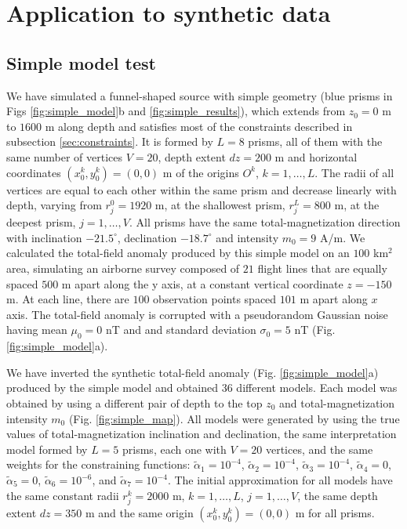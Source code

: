 \section{Application to synthetic data}\label{sec:synthetic}

\subsection{Simple model test}

We have simulated a funnel-shaped source with simple geometry (blue prisms in Figs \ref{fig:simple_model}b and \ref{fig:simple_results}), which extends from $z_0=0$ m to $1600$ m along depth and satisfies most of the constraints described in subsection \ref{sec:constraints}. It is formed by $L=8$ prisms, all of them with the same number of vertices $ V = 20 $, depth extent $ dz = 200 $ m and horizontal coordinates $ (x_0^k, y_0^k) = (0, 0) $ m of the origins $O^k$, $k=1,\dots,L$. The radii of all vertices are equal to each other within the same prism and decrease linearly with depth, varying from $r_j^0=1920$ m, at the shallowest prism, $r_j^L=800$ m, at the deepest prism, $j=1,\dots, V$. All prisms have the same total-magnetization direction with inclination $ -21.5^\circ $, declination $ -18.7^\circ $ and intensity $ m_0 = 9 $ A/m. We calculated the total-field anomaly produced by this simple model on an $ 100 $ km$^2$ area, simulating an airborne survey composed of $ 21 $ flight lines that are equally spaced $ 500 $ m apart along the y axis, at a constant vertical coordinate $ z = -150 $ m. At each line, there are $ 100 $ observation points spaced $101$ m apart along $ x $ axis. The total-field anomaly is corrupted with a pseudorandom Gaussian noise having mean $ \mu_0=0 $ nT and and standard deviation $ \sigma_0=5 $ nT (Fig. \ref{fig:simple_model}a).

We have inverted the synthetic total-field anomaly (Fig. \ref{fig:simple_model}a) produced by the simple model and obtained 36 different models. Each model was obtained by using a different pair of depth to the top $ z_0 $ and total-magnetization intensity $ m_0 $ (Fig. \ref{fig:simple_map}). All models were generated by using the true values of total-magnetization inclination and declination, the same interpretation model formed by $ L = 5 $ prisms, each one with $ V = 20 $ vertices, and the same weights for the constraining functions: $\tilde{\alpha}_1 = 10^{-4}$, $\tilde{\alpha}_2 = 10^{-4}$, $\tilde{\alpha}_3 = 10^{-4}$, $\tilde{\alpha}_4 = 0$, $\tilde{\alpha}_5 = 0$, $\tilde{\alpha}_6 = 10^{-6}$, and $\tilde{\alpha}_7 = 10^{-4}$. The initial approximation for all models have the same constant radii $ r^k_j = 2000 $ m, $ k = 1, \dots, L $, $ j  = 1, \dots, V $, the same depth extent $ dz = 350 $ m and the same origin $(x^k_0, y^k_0) = (0, 0) $ m for all prisms.

